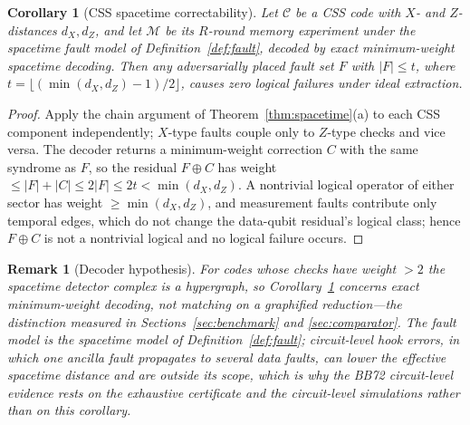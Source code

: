 \documentclass[pdflatex,sn-mathphys-num]{sn-jnl}
\theoremstyle{thmstyleone}
\newtheorem{corollary}[theorem]{Corollary}
\theoremstyle{thmstyletwo}
\newtheorem{remark}{Remark}
\theoremstyle{thmstylethree}
\begin{document}
\begin{corollary}[CSS spacetime correctability]\label{cor:css}
Let $\mathcal{C}$ be a CSS code with $X$- and $Z$-distances $d_X,d_Z$, and let $\mathcal{M}$ be its $R$-round memory experiment under the spacetime fault model of Definition~\ref{def:fault}, decoded by exact minimum-weight spacetime decoding. Then any adversarially placed fault set $F$ with $|F|\le t$, where $t=\lfloor(\min(d_X,d_Z)-1)/2\rfloor$, causes zero logical failures under ideal extraction.
\end{corollary}
\begin{proof}
Apply the chain argument of Theorem~\ref{thm:spacetime}(a) to each CSS component independently; $X$-type faults couple only to $Z$-type checks and vice versa. The decoder returns a minimum-weight correction $C$ with the same syndrome as $F$, so the residual $F\oplus C$ has weight $\le|F|+|C|\le2|F|\le2t<\min(d_X,d_Z)$. A nontrivial logical operator of either sector has weight $\ge\min(d_X,d_Z)$, and measurement faults contribute only temporal edges, which do not change the data-qubit residual's logical class; hence $F\oplus C$ is not a nontrivial logical and no logical failure occurs.
\end{proof}
\begin{remark}[Decoder hypothesis]\label{rem:css-scope}
For codes whose checks have weight $>2$ the spacetime detector complex is a hypergraph, so Corollary~\ref{cor:css} concerns exact minimum-weight decoding, not matching on a graphified reduction---the distinction measured in Sections~\ref{sec:benchmark} and \ref{sec:comparator}. The fault model is the spacetime model of Definition~\ref{def:fault}; circuit-level hook errors, in which one ancilla fault propagates to several data faults, can lower the effective spacetime distance and are outside its scope, which is why the BB72 circuit-level evidence rests on the exhaustive certificate and the circuit-level simulations rather than on this corollary.
\end{remark}
\end{document}
